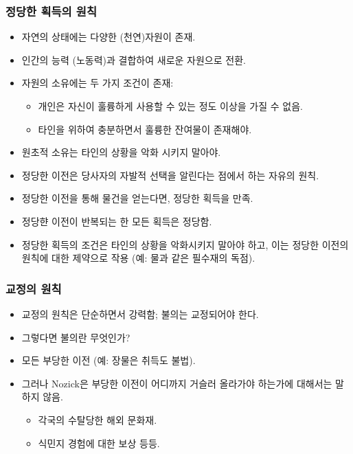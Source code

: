 \documentclass[aspectratio=169,xcolor=dvipsnames,handout]{beamer}
\begin{document}
\begin{frame}[allowframebreaks]
\frametitle{정당한 획득의 원칙}
    \begin{itemize}
        \item 자연의 상태에는 다양한 (천연)자원이 존재.
        \item 인간의 능력 (노동력)과 결합하여 새로운 자원으로 전환.
        \item 자원의 소유에는 두 가지 조건이 존재:
        \begin{itemize}
            \item 개인은 자신이 훌륭하게 사용할 수 있는 정도 이상을 가질 수 없음.
            \item 타인을 위하여 충분하면서 훌륭한 잔여물이 존재해야.
        \end{itemize}
        \item 원초적 소유는 타인의 상황을 악화 시키지 말아야.
    \framebreak%
        \item 정당한 이전은 당사자의 자발적 선택을 알린다는 점에서 하는 자유의 원칙.
        \item 정당한 이전을 통해 물건을 얻는다면, 정당한 획득을 만족.
        \item 정당햔 이전이 반복되는 한 모든 획득은 정당함.
        \item 정당한 획득의 조건은 타인의 상황을 악화시키지 말아야 하고, 이는 정당한 이전의 원칙에 대한 제약으로 작용 (예: 물과 같은 필수재의 독점).
    \end{itemize}
\end{frame}

\begin{frame}[<+->]
\frametitle{교정의 원칙}
    \begin{itemize}
        \item 교정의 원칙은 단순하면서 강력함; 불의는 교정되어야 한다.
        \item 그렇다면 불의란 무엇인가?
        \item 모든 부당한 이전 (예: 장물은 취득도 불법).
        \item 그러나 Nozick은 부당한 이전이 어디까지 거슬러 올라가야 하는가에 대해서는 말하지 않음.
        \begin{itemize}
            \item 각국의 수탈당한 해외 문화재.
            \item 식민지 경험에 대한 보상 등등.
        \end{itemize}
    \end{itemize}
\end{frame}
\end{document}
